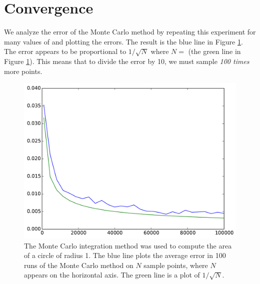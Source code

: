 \section*{Convergence}

We analyze the error of the Monte Carlo method by repeating this experiment for many values of  and plotting the errors.
The result is the blue line in Figure \ref{fig:mc_error}.
The error appears to be proportional to $1/\sqrt{N}$ where $N=$  (the green line in Figure \ref{fig:mc_error}).
This means that to divide the error by 10, we must sample \emph{100 times} more points.

\begin{figure}
\includegraphics[width=.7\textwidth]{mc_error.pdf}
\caption{The Monte Carlo integration method was used to compute the area of a circle of radius 1. 
The blue line plots the average error in 100 runs of the Monte Carlo method on $N$ sample points, where $N$ appears on the horizontal axis.
The green line is a plot of $1/\sqrt{N}$. }
\label{fig:mc_error}
\end{figure}


